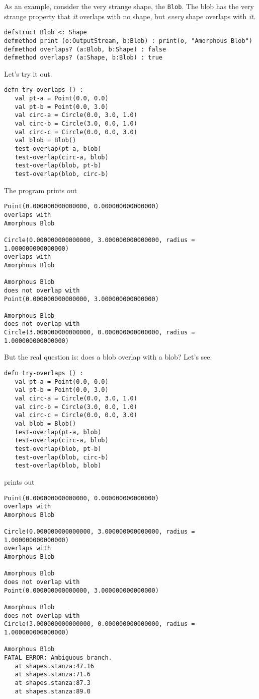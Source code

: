 \documentclass[10pt,oneside]{book}
\begin{document}
As an example, consider the very strange shape, the \texttt{\frenchspacing Blob}. The blob has the very strange property that {\em it} overlaps with no shape, but {\em every} shape overlaps with {\em it}. 
\begin{lstlisting}
defstruct Blob <: Shape
defmethod print (o:OutputStream, b:Blob) : print(o, "Amorphous Blob")
defmethod overlaps? (a:Blob, b:Shape) : false
defmethod overlaps? (a:Shape, b:Blob) : true
\end{lstlisting}
Let's try it out.
\begin{lstlisting}
defn try-overlaps () :
   val pt-a = Point(0.0, 0.0)
   val pt-b = Point(0.0, 3.0)
   val circ-a = Circle(0.0, 3.0, 1.0)
   val circ-b = Circle(3.0, 0.0, 1.0)
   val circ-c = Circle(0.0, 0.0, 3.0)
   val blob = Blob()
   test-overlap(pt-a, blob)
   test-overlap(circ-a, blob)
   test-overlap(blob, pt-b)
   test-overlap(blob, circ-b)
\end{lstlisting}
The program prints out
\begin{lstlisting}
Point(0.000000000000000, 0.000000000000000)
overlaps with
Amorphous Blob

Circle(0.000000000000000, 3.000000000000000, radius = 1.000000000000000)
overlaps with
Amorphous Blob

Amorphous Blob
does not overlap with
Point(0.000000000000000, 3.000000000000000)

Amorphous Blob
does not overlap with
Circle(3.000000000000000, 0.000000000000000, radius = 1.000000000000000)
\end{lstlisting}

But the real question is: does a blob overlap with a blob? Let's see.
\begin{lstlisting}
defn try-overlaps () :
   val pt-a = Point(0.0, 0.0)
   val pt-b = Point(0.0, 3.0)
   val circ-a = Circle(0.0, 3.0, 1.0)
   val circ-b = Circle(3.0, 0.0, 1.0)
   val circ-c = Circle(0.0, 0.0, 3.0)
   val blob = Blob()
   test-overlap(pt-a, blob)
   test-overlap(circ-a, blob)
   test-overlap(blob, pt-b)
   test-overlap(blob, circ-b)
   test-overlap(blob, blob)
\end{lstlisting}
prints out
\begin{lstlisting}
Point(0.000000000000000, 0.000000000000000)
overlaps with
Amorphous Blob

Circle(0.000000000000000, 3.000000000000000, radius = 1.000000000000000)
overlaps with
Amorphous Blob

Amorphous Blob
does not overlap with
Point(0.000000000000000, 3.000000000000000)

Amorphous Blob
does not overlap with
Circle(3.000000000000000, 0.000000000000000, radius = 1.000000000000000)

Amorphous Blob
FATAL ERROR: Ambiguous branch.
   at shapes.stanza:47.16
   at shapes.stanza:71.6
   at shapes.stanza:87.3
   at shapes.stanza:89.0
\end{lstlisting}
\end{document}
